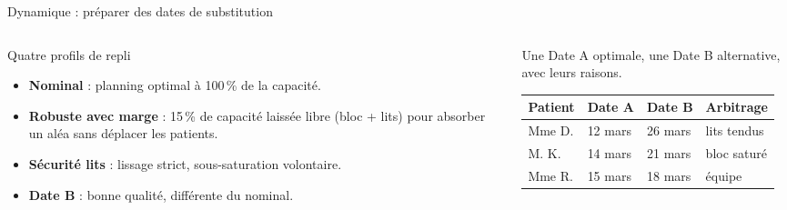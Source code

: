 \begin{frame}{Dynamique : préparer des dates de substitution}
  \scriptsize
  \begin{columns}[T,onlytextwidth]
    \begin{column}{0.46\textwidth}
      \begin{block}{Quatre profils de repli}
        \begin{itemize}
          \item \textbf{Nominal} : planning optimal à 100\,\% de la capacité.
          \item \textbf{Robuste avec marge} : 15\,\% de capacité laissée libre
            (bloc + lits) pour absorber un aléa sans déplacer les patients.
          \item \textbf{Sécurité lits} : lissage strict, sous-saturation
            volontaire.
          \item \textbf{Date B} : bonne qualité, différente du nominal.
        \end{itemize}
      \end{block}
    \end{column}

    \begin{column}{0.52\textwidth}
      \footnotesize Une Date A optimale, une Date B alternative, avec leurs
      raisons.

      \par\vspace{0.12cm}
      \renewcommand{\arraystretch}{1.25}
      \centering
      \begin{tabular}{@{}p{1.9cm}p{1.45cm}p{1.45cm}p{1.75cm}@{}}
        \toprule
        Patient & Date A & Date B & Arbitrage \\
        \midrule
        Mme D. & 12 mars & 26 mars & lits tendus \\
        M. K. & 14 mars & 21 mars & bloc saturé \\
        Mme R. & 15 mars & 18 mars & équipe \\
        \bottomrule
      \end{tabular}

    \end{column}
  \end{columns}
\end{frame}

